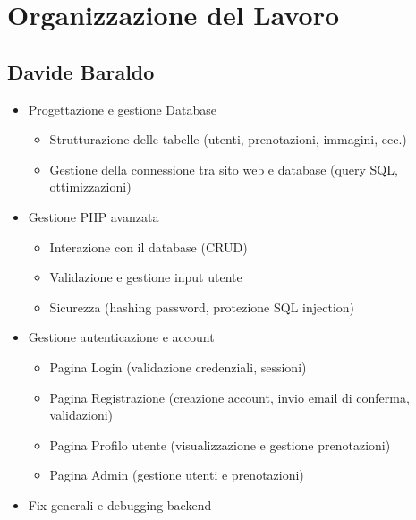 \section{Organizzazione del Lavoro}

\subsection{Davide Baraldo}
\begin{itemize}
    \item Progettazione e gestione Database
    \begin{itemize}
        \item Strutturazione delle tabelle (utenti, prenotazioni, immagini, ecc.)
        \item Gestione della connessione tra sito web e database (query SQL, ottimizzazioni)
    \end{itemize}
    \item Gestione PHP avanzata
    \begin{itemize}
        \item Interazione con il database (CRUD)
        \item Validazione e gestione input utente
        \item Sicurezza (hashing password, protezione SQL injection)
    \end{itemize}
    \item Gestione autenticazione e account
    \begin{itemize}
        \item Pagina Login (validazione credenziali, sessioni)
        \item Pagina Registrazione (creazione account, invio email di conferma, validazioni)
        \item Pagina Profilo utente (visualizzazione e gestione prenotazioni)
        \item Pagina Admin (gestione utenti e prenotazioni)
    \end{itemize}
    \item Fix generali e debugging backend
\end{itemize}

